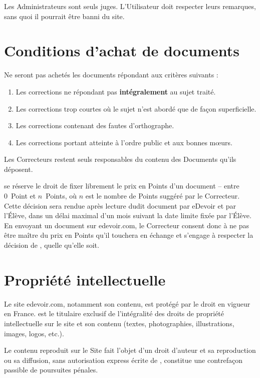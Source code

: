 Les Administrateurs sont seuls juges. L'Utilisateur doit respecter leurs remarques, sans quoi il pourrait être banni du site.


\section{Conditions d'achat de documents}

Ne seront pas achetés les documents répondant aux critères suivants :
\begin{enumerate}
   \item Les corrections ne répondant pas \textbf{intégralement} au sujet traité.
   \item Les corrections trop courtes où le sujet n'est abordé que de façon superficielle.
   \item Les corrections contenant des fautes d'orthographe.
   \item Les corrections portant atteinte à l'ordre public et aux bonnes m\oe{}urs.
\end{enumerate}

Les Correcteurs restent seuls responsables du contenu des Documents qu'ils déposent.

\eDevoir se réserve le droit de fixer librement le prix en Points d'un document -- entre 0~Point et $n$~Points, où $n$ est le nombre de Points suggéré par le Correcteur. Cette décision sera rendue après lecture dudit document par eDevoir et par l'Élève, dans un délai maximal d'un mois suivant la date limite fixée par l'Élève. En envoyant un document sur edevoir.com, le Correcteur consent donc à ne pas être maître du prix en Points qu'il touchera en échange et s'engage à respecter la décision de \eDevoir, quelle qu'elle soit.


\section{Propriété intellectuelle}

Le site edevoir.com, notamment son contenu, est protégé par le droit en vigueur en France. \eDevoir est le titulaire exclusif de l'intégralité des droits de propriété intellectuelle sur le site et son contenu (textes, photographies, illustrations, images, logos, etc.).

Le contenu reproduit sur le Site fait l'objet d'un droit d'auteur et sa reproduction ou sa diffusion, sans autorisation express écrite de \eDevoir, constitue une contrefaçon passible de poursuites pénales.

